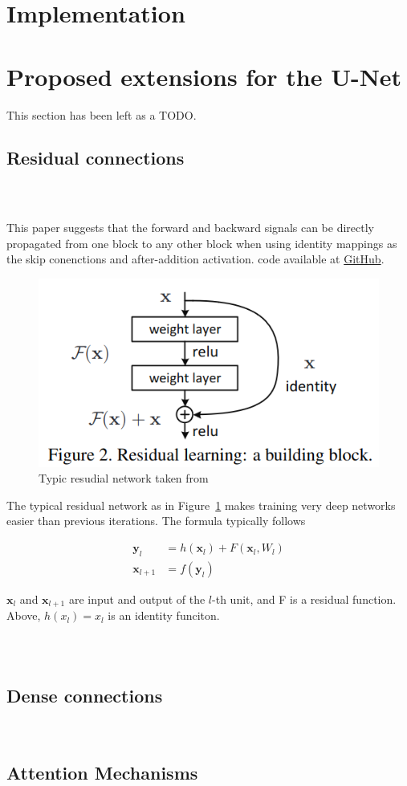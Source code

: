 \documentclass[11pt]{article}
\begin{document}
\section{Implementation}

\section{Proposed extensions for the U-Net}

This section has been left as a TODO.

\subsection{Residual connections}

\subsubsection{~\cite{identity-mappings-drns}}

This paper suggests that the forward and backward signals can be directly propagated from one block to any other block when using identity mappings as the skip conenctions and after-addition activation. code available at \href{https://github.com/KaimingHe/resnet-1k-layers/blob/master/resnet-pre-act.lua}{GitHub}.

\begin{figure}[H]
    \centering
    \includegraphics[width=0.4\linewidth]{images/residualArchitecture.png}
    \caption{Typic resudial network taken from~\cite{drn-for-image-recognition}}
    \label{residual-architecture}
\end{figure}

The typical residual network as in Figure~\ref{residual-architecture} makes training very deep networks easier than previous iterations. The formula typically follows 

\begin{align}
    \textbf{y}_l &= h(\textbf{x}_l) + F(\textbf{x}_l, W_l) \\
    \textbf{x}_{l+1} &= f(\textbf{y}_l)
\end{align}

$\textbf{x}_l$ and $\textbf{x}_{l+1}$ are input and output of the $l$-th unit, and F is a residual function. Above, 
$h(x_l)=x_l$ is an identity funciton. 

\subsubsection{~\cite{v-net}}

\subsection{Dense connections}

~\cite{tiramisu-densenet}

\subsection{Attention Mechanisms}

~\cite{attention-u-net}

\printbibliography
\end{document}
